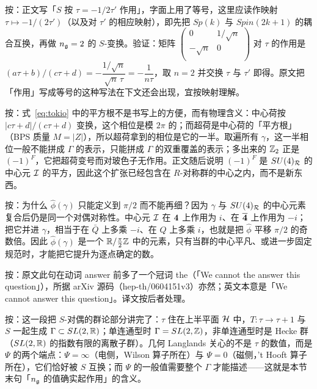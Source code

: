 \begin{yizhu}[含糊点拨]
按：正文写「$S$ 按 $\tau=-1/2\tau'$ 作用」，字面上用了等号，这里应读作映射 $\tau\mapsto -1/(2\tau')$（以及对 $\tau'$ 的相应映射），即先把 $Sp(k)$ 与 $Spin(2k+1)$ 的耦合互换，再做 $n_{\frak g}=2$ 的 $S$-变换。验证：矩阵 $\left(\begin{matrix}0 & 1/\sqrt{n}\\ -\sqrt n & 0\\\end{matrix}\right)$ 对 $\tau$ 的作用是 $(a\tau+b)/(c\tau+d)=-\dfrac{1/\sqrt n}{\sqrt n\,\tau}=-\dfrac{1}{n\tau}$，取 $n=2$ 并交换 $\tau$ 与 $\tau'$ 即得。原文把「作用」写成等号的这种写法在下文还会出现，宜按映射理解。
\end{yizhu}

\begin{yizhu}[物理图像]
按：式~\eqref{eq:tokio} 中的平方根不是书写上的方便，而有物理含义：中心荷按 $|c\tau+d|/(c\tau+d)$ 变换，这个相位是模 $2\pi$ 的；而超荷是中心荷的「平方根」（BPS 质量 $M=|Z|$），所以超荷拿到的相位是它的一半。取遍所有 $\gamma$，这一半相位一般不能拼成 $\Gamma$ 的表示，只能拼成 $\Gamma$ 的双重覆盖的表示；多出来的 $\Bbb{Z}_2$ 正是 $(-1)^F$，它把超荷变号而对玻色子无作用。正文随后说明 $(-1)^F$ 是 $SU(4)_{\cal R}$ 的中心元 ${\EUI}$ 的平方，因此这个扩张已经包含在 $R$-对称群的中心之内，而不是新东西。
\end{yizhu}

\begin{yizhu}[含糊点拨]
按：为什么 $\hat\phi(\gamma)$ 只能定义到 $\pi/2$ 而不能再细？因为 $\gamma$ 与 $SU(4)_{\cal R}$ 的中心元素复合后仍是同一个对偶对称性。中心元 ${\EUI}$ 在 ${\bf 4}$ 上作用为 $i$、在 $\bar{\bf 4}$ 上作用为 $-i$；把它并进 $\gamma$，相当于在 $\bar Q$ 上多乘 $-i$、在 $Q$ 上多乘 $i$，也就是把 $\hat\phi$ 平移 $\pi/2$ 的奇数倍。因此 $\hat\phi(\gamma)$ 是一个 $\Bbb{R}/\frac{\pi}{2}\Bbb{Z}$ 中的元素，只有当群的中心平凡、或进一步固定规范时，才能把它提升为逐点确定的数。
\end{yizhu}

\begin{yizhu}[原文疑误]
按：原文此句在动词 answer 前多了一个冠词 the（「We cannot the answer this question」），所据 arXiv 源码（hep-th/0604151v3）亦然；英文本意是「We cannot answer this question」。译文按后者处理。
\end{yizhu}

\begin{yizhu}[物理图像]
按：这一段把 $S$-对偶的群论部分讲完了：$\tau$ 住在上半平面 ${\EUH}$ 中，$T:\tau\to\tau+1$ 与 $S$ 一起生成 $\Gamma\subset SL(2,\Bbb{R})$；单连通型时 $\Gamma=SL(2,\Bbb{Z})$，非单连通型时是 Hecke 群（$SL(2,\Bbb{R})$ 的指数有限的离散子群）。几何 Langlands 关心的不是 $\tau$ 的数值，而是 $\Psi$ 的两个端点：$\Psi=\infty$（电侧，Wilson 算子所在）与 $\Psi=0$（磁侧，'t Hooft 算子所在），它们恰好被 $S$ 互换；而 $\Psi$ 的一般值需要整个 $\Gamma$ 才能描述——这就是本节末句「$n_{\frak g}$ 的值确实起作用」的含义。
\end{yizhu}
